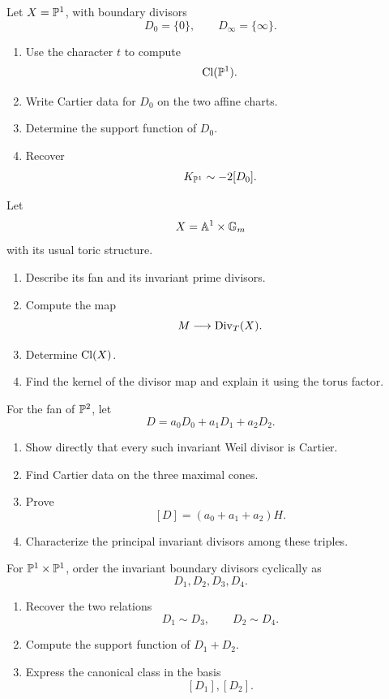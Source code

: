 \begin{exercises}

\item Let \(X=\mathbb{P}^1\), with boundary divisors
\[
D_0=\{0\},
\qquad
D_\infty=\{\infty\}.
\]
\begin{enumerate}[label=(\alph*),wide=0pt]
\item Use the character \(t\) to compute
\[
\operatorname{Cl}(\mathbb{P}^1).
\]
\item Write Cartier data for \(D_0\) on the two affine charts.
\item Determine the support function of \(D_0\).
\item Recover
\[
K_{\mathbb{P}^1}\sim-2[D_0].
\]
\end{enumerate}

\item Let
\[
X=\mathbb{A}^1\times\mathbb{G}_{m}
\]
with its usual toric structure.
\begin{enumerate}[label=(\alph*),wide=0pt]
\item Describe its fan and its invariant prime divisors.
\item Compute the map
\[
M\longrightarrow\operatorname{Div}_T(X).
\]
\item Determine \(\operatorname{Cl}(X)\).
\item Find the kernel of the divisor map and explain it using the
torus factor.
\end{enumerate}

\item For the fan of \(\mathbb{P}^2\), let
\[
D=a_0D_0+a_1D_1+a_2D_2.
\]
\begin{enumerate}[label=(\alph*),wide=0pt]
\item Show directly that every such invariant Weil divisor is Cartier.
\item Find Cartier data on the three maximal cones.
\item Prove
\[
[D]=(a_0+a_1+a_2)H.
\]
\item Characterize the principal invariant divisors among these
triples.
\end{enumerate}

\item For \(\mathbb{P}^1\times\mathbb{P}^1\), order the invariant boundary divisors
cyclically as
\[
D_1,D_2,D_3,D_4.
\]
\begin{enumerate}[label=(\alph*),wide=0pt]
\item Recover the two relations
\[
D_1\sim D_3,
\qquad
D_2\sim D_4.
\]
\item Compute the support function of \(D_1+D_2\).
\item Express the canonical class in the basis
\[
[D_1],[D_2].
\]
\end{enumerate}


\end{exercises}
